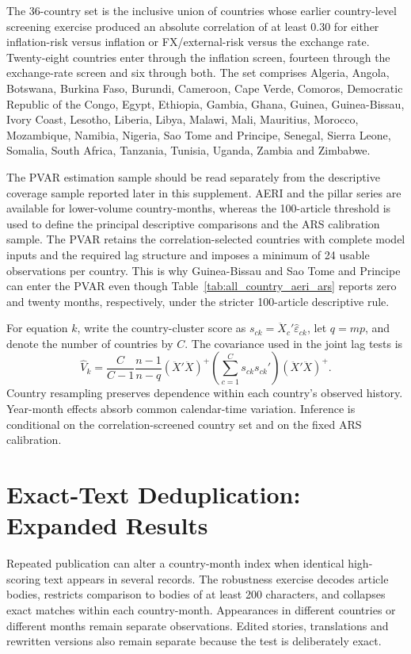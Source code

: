 \documentclass[11pt]{article}
\begin{document}


The 36-country set is the inclusive union of countries whose earlier country-level screening exercise produced an absolute correlation of at least 0.30 for either inflation-risk versus inflation or FX/external-risk versus the exchange rate. Twenty-eight countries enter through the inflation screen, fourteen through the exchange-rate screen and six through both. The set comprises Algeria, Angola, Botswana, Burkina Faso, Burundi, Cameroon, Cape Verde, Comoros, Democratic Republic of the Congo, Egypt, Ethiopia, Gambia, Ghana, Guinea, Guinea-Bissau, Ivory Coast, Lesotho, Liberia, Libya, Malawi, Mali, Mauritius, Morocco, Mozambique, Namibia, Nigeria, Sao Tome and Principe, Senegal, Sierra Leone, Somalia, South Africa, Tanzania, Tunisia, Uganda, Zambia and Zimbabwe.

The PVAR estimation sample should be read separately from the descriptive coverage sample reported later in this supplement. AERI and the pillar series are available for lower-volume country-months, whereas the 100-article threshold is used to define the principal descriptive comparisons and the ARS calibration sample. The PVAR retains the correlation-selected countries with complete model inputs and the required lag structure and imposes a minimum of 24 usable observations per country. This is why Guinea-Bissau and Sao Tome and Principe can enter the PVAR even though Table~\ref{tab:all_country_aeri_ars} reports zero and twenty months, respectively, under the stricter 100-article descriptive rule.

For equation $k$, write the country-cluster score as $s_{ck}=\ddot X_c'\widehat\varepsilon_{ck}$, let $q=mp$, and denote the number of countries by $C$. The covariance used in the joint lag tests is
\begin{equation}
\widehat V_k=
\frac{C}{C-1}\frac{n-1}{n-q}
(\ddot X'\ddot X)^+
\left(\sum_{c=1}^{C}s_{ck}s_{ck}'\right)
(\ddot X'\ddot X)^+.
\end{equation}
Country resampling preserves dependence within each country's observed history. Year-month effects absorb common calendar-time variation. Inference is conditional on the correlation-screened country set and on the fixed ARS calibration.

\section{Exact-Text Deduplication: Expanded Results}
Repeated publication can alter a country-month index when identical high-scoring text appears in several records. The robustness exercise decodes article bodies, restricts comparison to bodies of at least 200 characters, and collapses exact matches within each country-month. Appearances in different countries or different months remain separate observations. Edited stories, translations and rewritten versions also remain separate because the test is deliberately exact.
\end{document}
